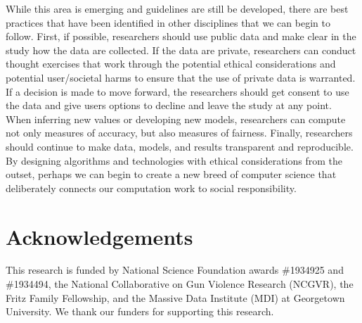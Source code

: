 \documentclass[11pt]{article} %
\begin{document}
While this area is emerging and guidelines are still be developed, there are best practices that have been identified in other disciplines that we can begin to follow. First, if possible, researchers should use public data and make clear in the study how the data are collected. If the data are private, researchers can conduct thought exercises that work through the potential ethical considerations and potential user/societal harms to ensure that the use of private data is warranted. If a decision is made to move forward, the researchers should get consent to use the data and give users options to decline and leave the study at any point. When inferring new values or developing new models, researchers can compute not only measures of accuracy, but also measures of fairness. Finally, researchers should continue to make data, models, and results transparent and reproducible. By designing algorithms and technologies with ethical considerations from the outset, perhaps we can begin to create a new breed of computer science that deliberately connects our computation work to social responsibility.
\section*{Acknowledgements}
This research is funded by National Science Foundation awards \#1934925 and \#1934494, the National Collaborative on Gun Violence Research (NCGVR), the Fritz Family Fellowship, and the Massive Data Institute (MDI) at Georgetown University. We thank our funders for supporting this research. 
\end{document}
